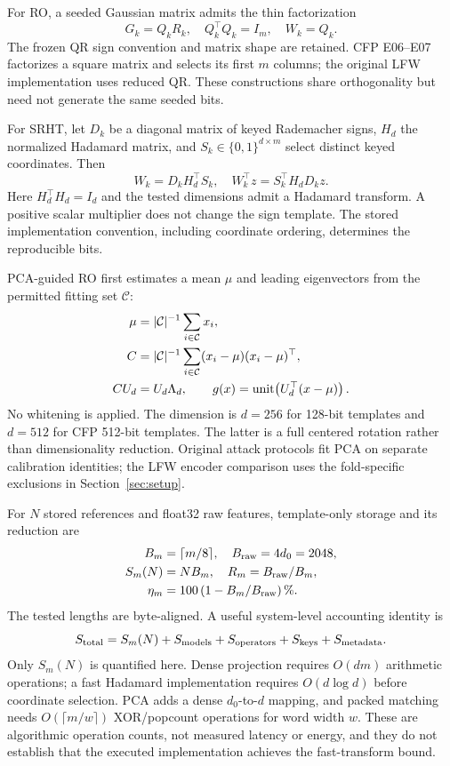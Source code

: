 For RO, a seeded Gaussian matrix admits the thin factorization
\begin{equation}
 G_k=Q_kR_k,\quad Q_k^\top Q_k=I_m,\quad W_k=Q_k.
\label{eq:ro}
\end{equation}
The frozen QR sign convention and matrix shape are retained. CFP E06--E07 factorizes a square matrix and selects its first $m$ columns; the original LFW implementation uses reduced QR. These constructions share orthogonality but need not generate the same seeded bits.

For SRHT, let $D_k$ be a diagonal matrix of keyed Rademacher signs, $H_d$ the normalized Hadamard matrix, and $S_k\in\{0,1\}^{d\times m}$ select distinct keyed coordinates. Then
\begin{equation}
 W_k=D_kH_d^\top S_k,\quad
 W_k^\top z=S_k^\top H_dD_kz.
\label{eq:srht}
\end{equation}
Here $H_d^\top H_d=I_d$ and the tested dimensions admit a Hadamard transform. A positive scalar multiplier does not change the sign template. The stored implementation convention, including coordinate ordering, determines the reproducible bits.

PCA-guided RO first estimates a mean $\mu$ and leading eigenvectors from the permitted fitting set $\mathcal C$:
\begin{align}
 \mu&=|\mathcal C|^{-1}\sum_{i\in\mathcal C}x_i,\\
 C&=|\mathcal C|^{-1}\sum_{i\in\mathcal C}(x_i-\mu)(x_i-\mu)^\top,\\
 CU_d&=U_d\Lambda_d,\qquad g(x)=\operatorname{unit}\!\left(U_d^\top(x-\mu)\right).
\label{eq:pca}
\end{align}
No whitening is applied. The dimension is $d=256$ for 128-bit templates and $d=512$ for CFP 512-bit templates. The latter is a full centered rotation rather than dimensionality reduction. Original attack protocols fit PCA on separate calibration identities; the LFW encoder comparison uses the fold-specific exclusions in Section~\ref{sec:setup}.


For $N$ stored references and float32 raw features, template-only storage and its reduction are
\begin{align}
 B_m&=\lceil m/8\rceil,\quad B_{\rm raw}=4d_0=2048,\\
 S_m(N)&=NB_m,\quad R_m=B_{\rm raw}/B_m,\\
 \eta_m&=100\left(1-B_m/B_{\rm raw}\right)\%.
\label{eq:storage}
\end{align}
The tested lengths are byte-aligned. A useful system-level accounting identity is
\begin{equation}
 S_{\rm total}=S_m(N)+S_{\rm models}+S_{\rm operators}
 +S_{\rm keys}+S_{\rm metadata}.
\end{equation}
Only $S_m(N)$ is quantified here. Dense projection requires $O(dm)$ arithmetic operations; a fast Hadamard implementation requires $O(d\log d)$ before coordinate selection. PCA adds a dense $d_0$-to-$d$ mapping, and packed matching needs $O(\lceil m/w\rceil)$ XOR/popcount operations for word width $w$. These are algorithmic operation counts, not measured latency or energy, and they do not establish that the executed implementation achieves the fast-transform bound.

